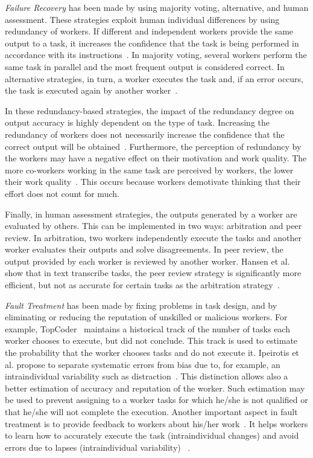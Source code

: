 \documentclass[11pt]{bmc_article_s50}
\begin{document}
\textit{Failure Recovery} has been made by using majority voting, alternative, and human assessment. These strategies exploit human individual differences by using redundancy of workers. If different and independent workers provide the same output to a task, it increases the confidence that the task is being performed in accordance with its instructions~\cite{Kochhar:2010}. In majority voting, several workers perform the same task in parallel and the most frequent output is considered correct. In alternative strategies, in turn, a worker executes the task and, if an error occurs, the task is executed again by another worker~\cite{Kulkarni2012}. {\color{black}In these redundancy-based strategies, the impact of the redundancy degree on output accuracy is highly dependent on the type of task. Increasing the redundancy of workers does not necessarily increase the confidence that the correct output will be obtained~\cite{Amir:2013}. Furthermore, the perception of redundancy by the workers may have a negative effect on their motivation and work quality. The more co-workers working in the same task are perceived by workers, the lower their work quality~\cite{Kinnaird:2013}. This occurs because workers demotivate thinking that their effort does not count for much.

Finally, in human assessment strategies, the outputs generated by a worker are evaluated by others. This can be implemented in two ways: arbitration and peer review. In arbitration, two workers independently execute the tasks and another worker evaluates their outputs and solve disagreements. In peer review, the output provided by each worker is reviewed by another worker. Hansen et al. show that in text transcribe tasks, the peer review strategy is significantly more efficient, but not as accurate for certain tasks as the arbitration strategy~\cite{Hansen:2013}.}

\textit{Fault Treatment} has been made by fixing problems in task design, and by eliminating or reducing the reputation of unskilled or malicious workers. For example, TopCoder~\cite{Archak:2010} maintains a historical track of the number of tasks each worker chooses to execute, but did not conclude. This track is used to estimate the probability that the worker chooses tasks and do not execute it. Ipeirotis et al. propose to separate systematic errors from bias due to, for example, an intraindividual variability such as distraction~\cite{Ipeirotis:HCOMP2010}. This distinction allows also a better estimation of accuracy and reputation of the worker. Such estimation may be used to prevent assigning to a worker tasks for which he/she is not qualified or that he/she will not complete the execution. Another important aspect in fault treatment is to provide feedback to workers about his/her work~\cite{Dow:CSCW:2012}. It helps workers to learn how to accurately execute the task (intraindividual changes) and avoid errors due to lapses (intraindividual variability)~\cite{Ipeirotis:HCOMP2010} .
\end{document}
